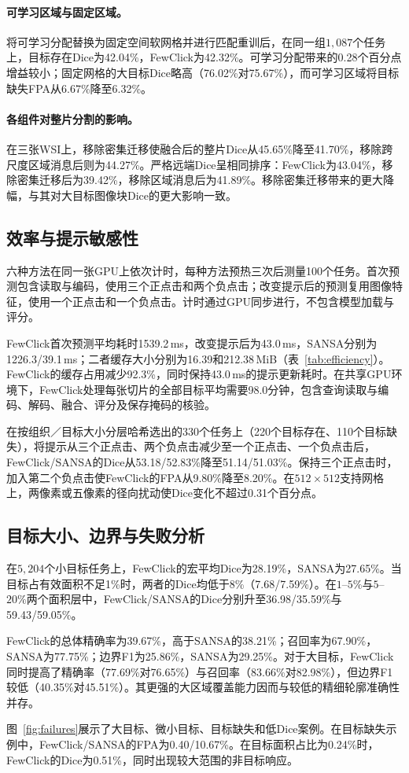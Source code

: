 \paragraph{可学习区域与固定区域。}
将可学习分配替换为固定空间软网格并进行匹配重训后，在同一组$1{,}087$个任务上，目标存在Dice为42.04\%，FewClick为42.32\%。可学习分配带来的0.28个百分点增益较小；固定网格的大目标Dice略高（76.02\%对75.67\%），而可学习区域将目标缺失FPA从6.67\%降至6.32\%。

\paragraph{各组件对整片分割的影响。}
在三张WSI上，移除密集迁移使融合后的整片Dice从45.65\%降至41.70\%，移除跨尺度区域消息后则为44.27\%。严格远端Dice呈相同排序：FewClick为43.04\%，移除密集迁移后为39.42\%，移除区域消息后为41.89\%。移除密集迁移带来的更大降幅，与其对大目标图像块Dice的更大影响一致。



\subsection{效率与提示敏感性}

六种方法在同一张GPU上依次计时，每种方法预热三次后测量100个任务。首次预测包含读取与编码，使用三个正点击和两个负点击；改变提示后的预测复用图像特征，使用一个正点击和一个负点击。计时通过GPU同步进行，不包含模型加载与评分。

FewClick首次预测平均耗时1539.2\,ms，改变提示后为43.0\,ms，SANSA分别为1226.3/39.1\,ms；二者缓存大小分别为16.39和212.38\,MiB（表~\ref{tab:efficiency}）。FewClick的缓存占用减少92.3\%，同时保持43.0\,ms的提示更新耗时。在共享GPU环境下，FewClick处理每张切片的全部目标平均需要98.0分钟，包含查询读取与编码、解码、融合、评分及保存掩码的核验。

在按组织／目标大小分层哈希选出的330个任务上（220个目标存在、110个目标缺失），将提示从三个正点击、两个负点击减少至一个正点击、一个负点击后，FewClick/SANSA的Dice从53.18/52.83\%降至51.14/51.03\%。保持三个正点击时，加入第二个负点击使FewClick的FPA从9.80\%降至8.20\%。在$512\times512$支持网格上，两像素或五像素的径向扰动使Dice变化不超过0.31个百分点。

\subsection{目标大小、边界与失败分析}

在$5{,}204$个小目标任务上，FewClick的宏平均Dice为28.19\%，SANSA为27.65\%。当目标占有效面积不足1\%时，两者的Dice均低于8\%（7.68/7.59\%）。在$1$--$5\%$与$5$--$20\%$两个面积层中，FewClick/SANSA的Dice分别升至36.98/35.59\%与59.43/59.05\%。

FewClick的总体精确率为39.67\%，高于SANSA的38.21\%；召回率为67.90\%，SANSA为77.75\%；边界F1为25.86\%，SANSA为29.25\%。对于大目标，FewClick同时提高了精确率（77.69\%对76.65\%）与召回率（83.66\%对82.98\%），但边界F1较低（40.35\%对45.51\%）。其更强的大区域覆盖能力因而与较低的精细轮廓准确性并存。

图~\ref{fig:failures}展示了大目标、微小目标、目标缺失和低Dice案例。在目标缺失示例中，FewClick/SANSA的FPA为0.40/10.67\%。在目标面积占比为0.24\%时，FewClick的Dice为0.51\%，同时出现较大范围的非目标响应。
